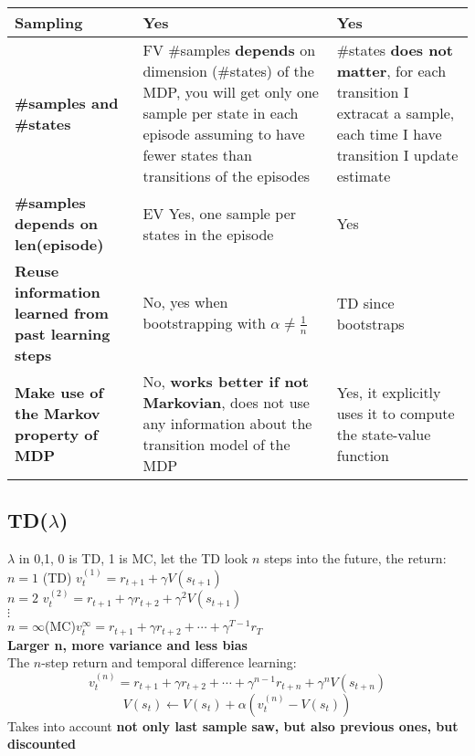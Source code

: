 \begin{tabularx}{\linewidth}{X|X|X}
        \textbf{Sampling} & Yes & Yes \\ \midrule
        \textbf{\#samples and \#states} & FV \#samples \textbf{depends} on dimension (\#states) of the MDP, you will get only one sample per state in each episode assuming to have fewer states than transitions of the episodes & \#states \textbf{does not matter}, for each transition I extracat a sample, each time I have transition I update estimate \\ \midrule
        \textbf{\#samples depends on len(episode)} & EV Yes, one sample per states in the episode & Yes \\ \midrule
        \textbf{Reuse information learned from past learning steps} & No, yes when bootstrapping with $\alpha\neq\frac{1}{n}$ & TD since bootstraps\\ \midrule
        \textbf{Make use of the Markov property of MDP} & No, \textbf{works better if not Markovian}, does not use any information about the transition model of the MDP & Yes, it explicitly uses it to compute the state-value function
    \end{tabularx}

\subsection{TD($\lambda$)}
    $\lambda$ in 0,1, 0 is TD, 1 is MC, let the TD look $n$ steps into the future, the return:\\
    $n=1$ \hspace{2em}(TD)\hspace{2em} $v_t^{(1)}=r_{t+1}+\gamma V(s_{t+1})$\\
    $n=2$ \hspace{6em} $v_t^{(2)}=r_{t+1}+\gamma r_{t+2}+\gamma^2V(s_{t+1})$\\
    $\vdots$\\
    $n=\infty$\hspace{2em}(MC)\hspace{2em}$v_t^{\infty}=r_{t+1}+\gamma r_{t+2}+\cdots+\gamma^{T-1}r_{T}$\\
    \textbf{Larger n, more variance and less bias}\\
    The $n$-step return and temporal difference learning:
    $$v_t^{(n)}=r_{t+1}+\gamma r_{t+2}+\cdots+\gamma^{n-1}r_{t+n}+\gamma^nV(s_{t+n})$$
    $$V(s_t)\leftarrow V(s_t)+\alpha(v_t^{(n)}-V(s_t))$$
    Takes into account \textbf{not only last sample saw, but also previous ones, but discounted}
